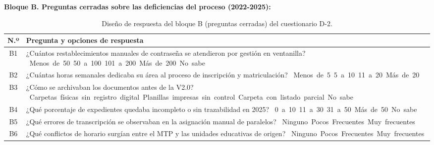 \Needspace{22cm}
\noindent\textbf{Bloque B. Preguntas cerradas sobre las deficiencias del proceso (2022-2025):}

\begin{table}[H]
    \centering
    \caption{Diseño de respuesta del bloque B (preguntas cerradas) del cuestionario D-2.}
    \label{tab:d2_cerradas}
    \renewcommand{\arraystretch}{1.60}
    \begin{tabularx}{\textwidth}{c L}
        \toprule
        \textbf{N.º} & \textbf{Pregunta y opciones de respuesta} \\
        \midrule
        B1 & ¿Cuántos restablecimientos manuales de contraseña se atendieron por gestión en ventanilla?\newline
            \mbox{\casilla{} Menos de 50}\quad \mbox{\casilla{} 50 a 100}\quad \mbox{\casilla{} 101 a 200}\quad \mbox{\casilla{} Más de 200}\quad \mbox{\casilla{} No sabe} \\
        \addlinespace
        B2 & ¿Cuántas horas semanales dedicaba su área al proceso de inscripción y matriculación?\newline
            \mbox{\casilla{} Menos de 5}\quad \mbox{\casilla{} 5 a 10}\quad \mbox{\casilla{} 11 a 20}\quad \mbox{\casilla{} Más de 20} \\
        \addlinespace
        B3 & ¿Cómo se archivaban los documentos antes de la V2.0?\newline
            \mbox{\casilla{} Carpetas físicas sin registro digital}\quad \mbox{\casilla{} Planillas impresas sin control}\quad \mbox{\casilla{} Carpeta con listado parcial}\quad \mbox{\casilla{} No sabe} \\
        \addlinespace
        B4 & ¿Qué porcentaje de expedientes quedaba incompleto o sin trazabilidad en 2025?\newline
            \mbox{\casilla{} 0 a 10}\quad \mbox{\casilla{} 11 a 30}\quad \mbox{\casilla{} 31 a 50}\quad \mbox{\casilla{} Más de 50}\quad \mbox{\casilla{} No sabe} \\
        \addlinespace
        B5 & ¿Qué errores de transcripción se observaban en la asignación manual de paralelos?\newline
            \mbox{\casilla{} Ninguno}\quad \mbox{\casilla{} Pocos}\quad \mbox{\casilla{} Frecuentes}\quad \mbox{\casilla{} Muy frecuentes} \\
        \addlinespace
        B6 & ¿Qué conflictos de horario surgían entre el MTP y las unidades educativas de origen?\newline
            \mbox{\casilla{} Ninguno}\quad \mbox{\casilla{} Pocos}\quad \mbox{\casilla{} Frecuentes}\quad \mbox{\casilla{} Muy frecuentes} \\

\end{tabularx}
\end{table}
